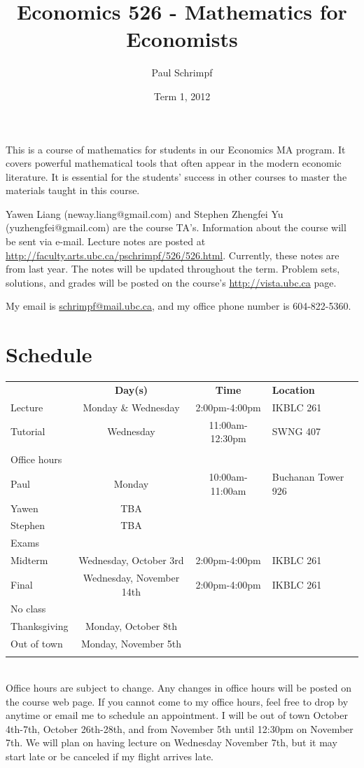 \documentclass[10pt]{article}
\title{Economics 526 - Mathematics for Economists}
\date{Term 1, 2012}
\author{Paul Schrimpf}
\begin{document}
\maketitle

This is a course of mathematics for students in our Economics MA
program. It covers powerful mathematical tools that often appear
in the modern economic literature. It is essential for the students'
success in other courses to master the materials taught in this
course.

Yawen Liang (neway.liang@gmail.com) and Stephen Zhengfei Yu
(yuzhengfei@gmail.com) are the course TA's.  Information about the
course will be sent via e-mail.  Lecture notes are posted at
\url{http://faculty.arts.ubc.ca/pschrimpf/526/526.html}. Currently,
these notes are from last year. The notes will be updated throughout
the term. Problem sets, solutions, and grades will be posted on the
course's \url{http://vista.ubc.ca} page.

 My email is
\href{mailto:schrimp@mail.ubc.ca}{schrimpf@mail.ubc.ca}, and my office
phone number is 604-822-5360.

\section{Schedule}
\begin{tabular}{l c c l}
  \hline 
  & \textbf{Day(s)} & \textbf{Time} & \textbf{Location} \\
  Lecture & Monday \& Wednesday & 2:00pm-4:00pm & IKBLC 261  
  \\
  Tutorial & Wednesday & 11:00am-12:30pm & SWNG 407 \\  
  \\
  Office hours \\
  \; Paul & Monday & 10:00am-11:00am & Buchanan Tower 926 \\
  \; Yawen & TBA & & \\ 
  \; Stephen & TBA & & \\ \hline
  Exams \\
  \; Midterm & Wednesday, October 3rd & 2:00pm-4:00pm & IKBLC 261 \\
  \; Final & Wednesday, November 14th & 2:00pm-4:00pm & IKBLC 261 \\
  No class \\
  \; Thanksgiving & Monday, October 8th \\
  \; Out of town & Monday, November 5th \\  
  \\ \hline 
\end{tabular} \\
Office hours are subject to change. Any changes in office hours will
be posted on the course web page. If you cannot come to my office
hours, feel free to drop by anytime or email me to schedule an
appointment.  I will be out of town October 4th-7th, October
26th-28th, and from November 5th until 12:30pm on November 7th. We will
plan on having lecture on Wednesday November 7th, but it may start
late or be canceled if my flight arrives late. 
\end{document}
